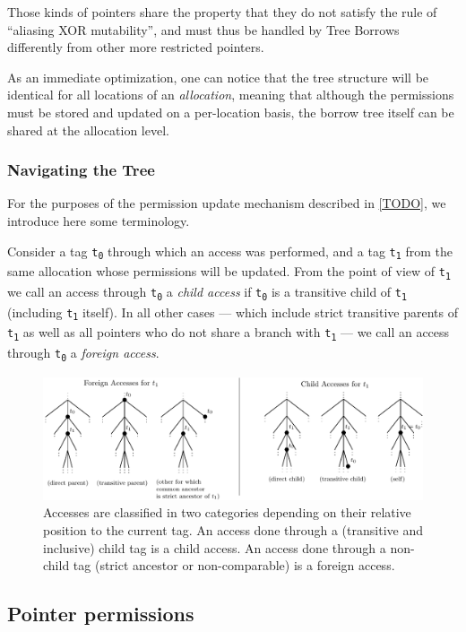 \documentclass[a4paper,11pt]{article}
\theoremstyle{plain}
\theoremstyle{definition}
\theoremstyle{remark}
\newcommand{\tcode}[1]{\texttt{#1}}
\newcommand{\tsub}[1]{\textsubscript{#1}}
\begin{document}
Those kinds of pointers share the property that they do not satisfy the rule
of ``aliasing XOR mutability'', and must thus be handled by Tree Borrows differently
from other more restricted pointers.

As an immediate optimization, one can notice that the tree structure will
be identical for all locations of an \textit{allocation}, meaning that although
the permissions must be stored and updated on a per-location basis, the
borrow tree itself can be shared at the allocation level.

\subsubsection{Navigating the Tree}

For the purposes of the permission update mechanism described in \ref{TODO},
we introduce here some terminology.

Consider a tag \tcode{t\tsub{0}} through which an access was performed, and a tag
\tcode{t\tsub{1}} from the same allocation whose permissions will be updated. From the point
of view of \tcode{t\tsub{1}} we call an access through \tcode{t\tsub{0}} a \textit{child access}
if \tcode{t\tsub{0}} is a transitive child of \tcode{t\tsub{1}} (including \tcode{t\tsub{1}} itself).
In all other cases --- which include strict transitive parents of \tcode{t\tsub{1}} as well as
all pointers who do not share a branch with \tcode{t\tsub{1}} --- we call an access through
\tcode{t\tsub{0}} a \textit{foreign access}.

\begin{figure}
    \includegraphics[width=\textwidth]{../figs/accesses-kinds.pdf}
    \caption{Accesses are classified in two categories depending on their relative position
    to the current tag. An access done through a (transitive and inclusive) child tag is a child access.
    An access done through a non-child tag (strict ancestor or non-comparable) is a foreign access.}
    \label{fig:kinds-of-accesses}
\end{figure}


\subsection{Pointer permissions}
\end{document}
